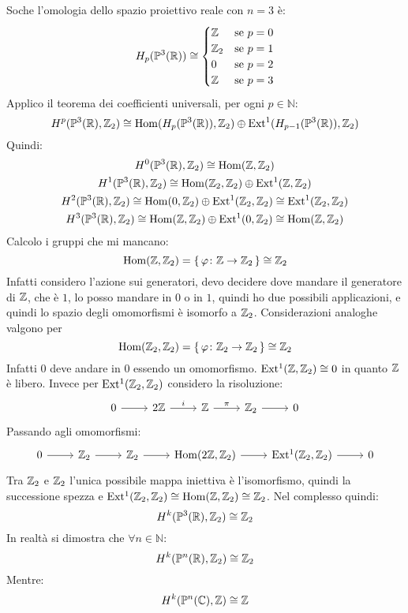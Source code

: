\begin{example}
  Soche l'omologia dello spazio proiettivo reale con $ n = 3 $ è:
  \[
    H_p(\mathbb{P}^{3} (\mathbb{R})) \cong
    \begin{cases}
      \mathbb{Z} & \text{se } p = 0 \\
      \mathbb{Z}_2 & \text{se } p = 1 \\
      0 & \text{se } p = 2 \\
      \mathbb{Z} & \text{se } p = 3
    \end{cases}
  \]
  Applico il teorema dei coefficienti universali, per ogni $ p \in \mathbb{N} $:
  \[
    H^p(\mathbb{P}^{3} (\mathbb{R}), \mathbb{Z}_2) \cong \mathrm{Hom}( H_p(\mathbb{P}^{3} (\mathbb{R})), \mathbb{Z}_2) \oplus \mathrm{Ext^1}( H_{p-1}(\mathbb{P}^{3} (\mathbb{R})), \mathbb{Z}_2)
  \]
  Quindi:
  \begin{gather*}
    H^0(\mathbb{P}^{3} (\mathbb{R}), \mathbb{Z}_2) \cong \mathrm{Hom}( \mathbb{Z}, \mathbb{Z}_2) \\
    H^1(\mathbb{P}^{3} (\mathbb{R}), \mathbb{Z}_2) \cong \mathrm{Hom}( \mathbb{Z}_2, \mathbb{Z}_2) \oplus \mathrm{Ext^1}( \mathbb{Z}, \mathbb{Z}_2) \\
    H^2(\mathbb{P}^{3} (\mathbb{R}), \mathbb{Z}_2) \cong \mathrm{Hom}( 0, \mathbb{Z}_2) \oplus \mathrm{Ext^1}( \mathbb{Z}_2, \mathbb{Z}_2) \cong \mathrm{Ext^1}( \mathbb{Z}_2, \mathbb{Z}_2) \\
    H^3(\mathbb{P}^{3} (\mathbb{R}), \mathbb{Z}_2) \cong \mathrm{Hom}( \mathbb{Z}, \mathbb{Z}_2) \oplus \mathrm{Ext^1}( 0, \mathbb{Z}_2) \cong \mathrm{Hom}( \mathbb{Z}, \mathbb{Z}_2)
  \end{gather*}
  Calcolo i gruppi che mi mancano:
  \[
    \mathrm{Hom}( \mathbb{Z}, \mathbb{Z}_2) = \set{\varphi\colon \mathbb{Z}\to \mathbb{Z}_2 } \cong \mathbb{Z}_2
  \]
  Infatti considero l'azione sui generatori, devo decidere dove mandare il generatore di $ \mathbb{Z} $,
  che è $ 1 $, lo posso mandare in $ 0 $ o in $ 1 $, quindi ho due possibili applicazioni, e quindi
  lo spazio degli omomorfismi è isomorfo a $ \mathbb{Z}_2 $. Considerazioni analoghe valgono per
  \[
    \mathrm{Hom}( \mathbb{Z}_2, \mathbb{Z}_2) = \set{\varphi\colon \mathbb{Z}_2 \to \mathbb{Z}_2 } \cong \mathbb{Z}_2
  \]
  Infatti $ 0 $ deve andare in $ 0 $ essendo un omomorfismo.
  $ \mathrm{Ext^1}( \mathbb{Z}, \mathbb{Z}_2) \cong 0 $ in quanto $ \mathbb{Z} $ è libero.
  Invece per $ \mathrm{Ext^1}( \mathbb{Z}_2, \mathbb{Z}_2) $ considero la risoluzione:
  \[
    \begin{tikzcd}
      0 \rar & 2 \Z \rar{i} & \Z \rar{\pi} & \Z_2 \rar & 0
    \end{tikzcd}
  \]
  Passando agli omomorfismi:
  \[
    \begin{tikzcd}
      0 \rar & \Z_2 \rar & \Z_2 \rar & \hom{2\Z, \Z_2} \rar & \ext{\Z_2, \Z_2} \rar & 0
    \end{tikzcd}
  \]
  Tra $ \mathbb{Z}_2 $ e $ \mathbb{Z}_2 $ l'unica possibile mappa iniettiva è l'isomorfismo, quindi
  la successione spezza e $ \mathrm{Ext^1}( \mathbb{Z}_2, \mathbb{Z}_2) \cong \mathrm{Hom}( \mathbb{Z}, \mathbb{Z}_2) \cong \mathbb{Z}_2 $.
  Nel complesso quindi:
  \[
    H^k(\mathbb{P}^{3} (\mathbb{R}), \mathbb{Z}_2) \cong \mathbb{Z}_2
  \]
  In realtà si dimostra che $ \forall n \in \mathbb{N} $:
  \[
    H^k(\mathbb{P}^{n} (\mathbb{R}), \mathbb{Z}_2) \cong \mathbb{Z}_2
  \]
  Mentre:
  \[
    H^k(\mathbb{P}^{n} (\mathbb{C}), \mathbb{Z}) \cong \mathbb{Z}
  \]
\end{example}

